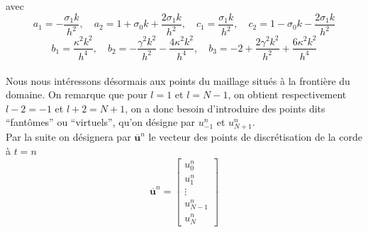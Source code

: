 \documentclass[a4,12pt]{article}
\newcommand{\ub}{\mathbf{u}}
\begin{document}
avec 
\[ 
  a_1=-\frac{\sigma_1 k}{h^2},\quad a_2=1+\sigma_0 k+\frac{2\sigma_1 k}{h^2}, 
  \quad c_1=\frac{\sigma_1 k}{h^2},\quad c_2=1-\sigma_0 k-\frac{2\sigma_1 k}{h^2}
\]
\[
  b_1=\frac{\kappa^2 k^2}{h^4}, \quad b_2=-\frac{\gamma^2 k^2}{h^2}-\frac{4\kappa^2 k^2}{h^4},
  \quad b_3=-2+\frac{2\gamma^2 k^2}{h^2}+\frac{6\kappa^2 k^2}{h^4}
\]
~\\

Nous nous intéressons désormais aux points du maillage situés à la frontière du domaine. On remarque que pour $l=1$ et $l=N-1$, on obtient respectivement $l-2=-1$ et $l+2=N+1$, on a donc besoin d'introduire des points dits \enquote{fantômes} ou \enquote{virtuels}, qu'on désigne par $u_{-1}^n$ et $u_{N+1}^n$.\\

Par la suite on désignera par $\overline{\ub}^n$ le vecteur des points de discrétisation de la corde à $t=n$ 
\[
  \overline{\ub}^n=\begin{bmatrix}u_0^n\\ u_1^n\\ \vdots \\ u_{N-1}^n \\ u_N^n\end{bmatrix}
\]
~\\
\end{document}
